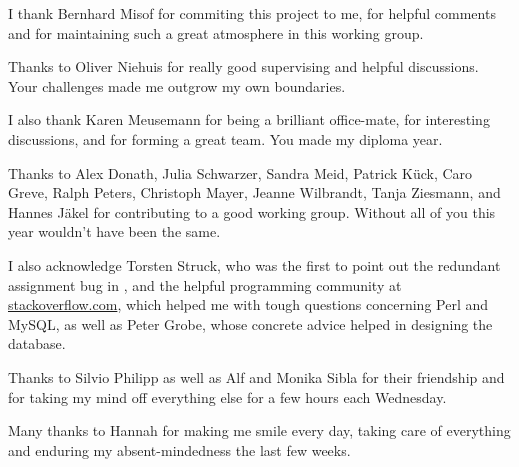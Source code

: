 I thank Bernhard Misof for commiting this project to me, for helpful comments
and for maintaining such a great atmosphere in this working group.

Thanks to Oliver Niehuis for really good supervising and helpful discussions.
Your challenges made me outgrow my own boundaries.

I also thank Karen Meusemann for being a brilliant office-mate, for interesting
discussions, and for forming a great team. You made my diploma year.

Thanks to Alex Donath, Julia Schwarzer, Sandra Meid, Patrick Kück, Caro Greve,
Ralph Peters, Christoph Mayer, Jeanne Wilbrandt, Tanja Ziesmann, and Hannes
Jäkel for contributing to a good working group. Without all of you this year
wouldn't have been the same.

I also acknowledge Torsten Struck, who was the first to point out the redundant
assignment bug in \hamstr, and the helpful programming community at
\url{stackoverflow.com}, which helped me with tough questions concerning Perl
and MySQL, as well as Peter Grobe, whose concrete advice helped in designing the
database.

Thanks to Silvio Philipp as well as Alf and Monika Sibla for their friendship
and for taking my mind off everything else for a few hours each Wednesday. 

Many thanks to Hannah for making me smile every day, taking care of everything
and enduring my absent-mindedness the last few weeks. 
